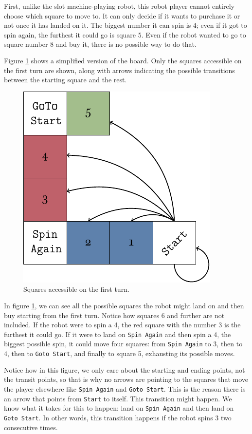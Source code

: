 First, unlike the slot machine-playing robot, this robot player cannot entirely
choose which square to move to. It can only decide if it wants to purchase it or
not once it has landed on it. The biggest number it can spin is 4; even if it
got to spin again, the furthest it could go is square 5. Even if the robot
wanted to go to square number 8 and buy it, there is no possible way to do that.

Figure \ref{fig:miniopoly-diagram-start} shows a simplified version of the
board. Only the squares accessible on the first turn are shown, along with
arrows indicating the possible transitions between the starting square and the
rest.
\begin{figure}[h]
	\centering
	\includegraphics[width=.65\textwidth]{img/diagram-start.pdf}
	\caption{Squares accessible on the first turn.}
	\label{fig:miniopoly-diagram-start}
\end{figure}

In figure \ref{fig:miniopoly-diagram-start}, we can see all the possible squares
the robot might land on and then buy starting from the first turn. Notice how
squares 6 and further are not included. If the robot were to spin a 4, the red
square with the number 3 is the furthest it could go. If it were to land on
\texttt{Spin Again} and then spin a 4, the biggest possible spin, it could move
four squares: from \texttt{Spin Again} to 3, then to 4, then to \texttt{Goto
Start}, and finally to square 5, exhausting its possible moves.

Notice how in this figure, we only care about the starting and ending points,
not the transit points, so that is why no arrows are pointing to the squares
that move the player elsewhere like \texttt{Spin Again} and \texttt{Goto Start}.
This is the reason there is an arrow that points from \texttt{Start} to itself.
This transition might happen. We know what it takes for this to happen: land on
\texttt{Spin Again} and then land on \texttt{Goto Start}. In other words, this
transition happens if the robot spins 3 two consecutive times.

